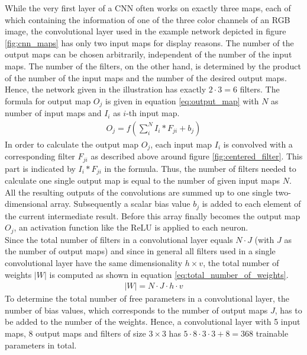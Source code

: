 \documentclass[11pt, a4paper]{article}
\newcommand\abs[1]{\left|#1\right|}
\begin{document}
While the very first layer of a \ac{CNN} often works on exactly three maps, each of which containing the information of one of the three color channels of an \ac{RGB} image, the convolutional layer used in the example network depicted in figure \ref{fig:cnn_maps} has only two input maps for display reasons. The number of the output maps can be chosen arbitrarily, independent of the number of the input maps. The number of the filters, on the other hand, is determined by the product of the number of the input maps and the number of the desired output maps. Hence, the network given in the illustration has exactly $2 \cdot 3 = 6$ filters. The formula for output map $O_j$ is given in equation \eqref{eq:output_map} with $N$ as number of input maps and $I_i$ as $i$-th input map.
\begin{align}
\label{eq:output_map}
O_j = f \left( \sum_i^{N} I_i * F_{ji} + b_j \right)
\end{align}
In order to calculate the output map $O_j$, each input map $I_i$ is convolved with a corresponding filter $F_{ji}$ as described above around figure \ref{fig:centered_filter}. This part is indicated by $I_i * F_{ji}$ in the formula. Thus, the number of filters needed to calculate one single output map is equal to the number of given input maps $N$. All the resulting outputs of the convolutions are summed up to one single two-dimensional array. Subsequently a scalar bias value $b_j$ is added to each element of the current intermediate result. Before this array finally becomes the output map $O_j$, an activation function like the \ac{ReLU} is applied to each neuron.\\
Since the total number of filters in a convolutional layer equals $N \cdot J$ (with $J$ as the number of output maps) and since in general all filters used in a single convolutional layer have the same dimensionality $h \times v$, the total number of weights $\abs{W}$ is computed as shown in equation \eqref{eq:total_number_of_weights}.
\begin{align}
\label{eq:total_number_of_weights}
\abs{W} = N \cdot J \cdot h \cdot v
\end{align}
To determine the total number of free parameters in a convolutional layer, the number of bias values, which corresponds to the number of output maps $J$, has to be added to the number of the weights. Hence, a convolutional layer with 5 input maps, 8 output maps and filters of size $3\times 3$ has $5 \cdot 8 \cdot 3 \cdot 3 +  8 = 368$ trainable parameters in total.
\end{document}
